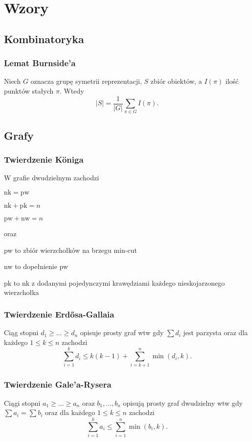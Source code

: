 \section{Wzory}

\subsection{Kombinatoryka}
\subsubsection{Lemat Burnside'a}
Niech $G$ oznacza grupę symetrii reprezentacji, $S$ zbiór obiektów,
a $I(\pi)$ ilość punktów stałych $\pi$. Wtedy
\[
  |S| = \frac{1}{|G|} \sum_{\pi \in G} I(\pi).
\]

\subsection{Grafy}
\subsubsection{Twierdzenie K\"oniga}
W grafie dwudzielnym zachodzi
\begin{compactitem}
  \item $\mathrm{nk} = \mathrm{pw}$
  \item $\mathrm{nk} + \mathrm{pk} = n$
  \item $\mathrm{pw} + \mathrm{nw} = n$
\end{compactitem}
oraz
\begin{compactitem}
  \item pw to zbiór wierzchołków na brzegu min-cut
  \item nw to dopełnienie pw
  \item pk to nk z dodanymi pojedynczymi krawędziami każdego nieskojarzonego wierzchołka
\end{compactitem}

\subsubsection{Twierdzenie Erd\H{o}sa-Gallaia}
Ciąg stopni $d_1 \geq \dots \geq d_n$ opisuje prosty graf wtw gdy
$\sum d_i$ jest parzysta oraz dla każdego $1 \leq k \leq n$ zachodzi
\[
  \sum_{i=1}^{k} d_i \leq k(k - 1) + \sum_{i=k + 1}^{n} \min(d_i, k).
\]

\subsubsection{Twierdzenie Gale'a-Rysera}
Ciągi stopni $a_1 \geq \dots \geq a_n$ oraz $b_1, \dots, b_n$ opisują
prosty graf dwudzielny wtw gdy $\sum a_i = \sum b_i$ oraz dla każdego $1 \leq k \leq n$ zachodzi
\[
  \sum_{i=1}^{k} a_i \leq \sum_{i=1}^{n} \min(b_i, k).
\]

